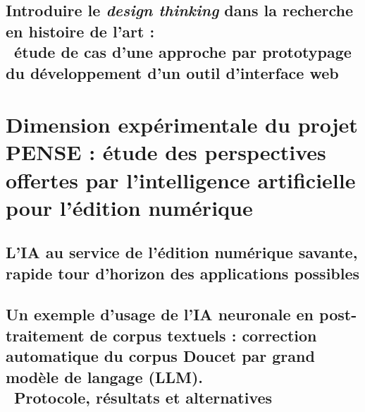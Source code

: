 \documentclass[a4paper,12pt,twoside]{book}
\newcommand{\sautdepage}{\newpage{\pagestyle{empty}\cleardoublepage}}
\begin{document}
            
            
        \sautdepage

        \hypertarget{chap5}{%
        \chapter[Introduire le \textit{design thinking} dans la recherche en histoire de l'art]{Introduire le \textit{design thinking} dans la recherche en histoire de l’art : \\ \ étude de cas d’une approche par prototypage du développement d’un outil d’interface web}\label{chap5-design-thinking}}

            
            
        \sautdepage

    \part{Dimension expérimentale du projet PENSE : étude des perspectives offertes par l’intelligence artificielle pour l’édition numérique}

        \hypertarget{chap6}{%
        \chapter{L’IA au service de l’édition numérique savante, rapide tour d’horizon des applications possibles}\label{chap6-ia}}

            
            
        \sautdepage

        \hypertarget{chap7}{%
        \chapter[Un exemple d’usage de l’IA neuronale en post-traitement de corpus textuels]{Un exemple d’usage de l’IA neuronale en post-traitement de corpus textuels : correction automatique du corpus Doucet par grand modèle de langage (LLM). \\ \ Protocole, résultats et alternatives}\label{chap7-llm-postco}}

            
            
        \sautdepage
        

\sautdepage
\end{document}
